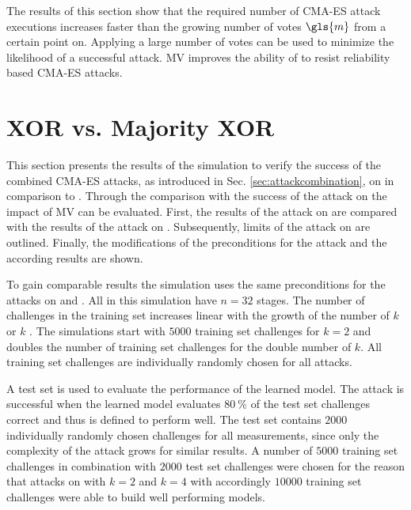 The results of this section show that the required number of \ac{CMA-ES} attack executions increases faster than the growing number of votes $\gls{m}$ from a certain point on.
Applying a large number of votes can be used to minimize the likelihood of a successful attack.
\ac{MV} improves the ability of \apufs to resist reliability based \ac{CMA-ES} attacks.


\section{\acs{XOR} \apufs vs. Majority \acs{XOR} \apufs}
\label{sec:xorarbitervsmajorityxorarbiter}


This section presents the results of the simulation to verify the success of the combined \ac{CMA-ES} attacks, as introduced in Sec. \ref{sec:attackcombination}, on \mxpufs in comparison to \xpufs.
Through the comparison with the success of the attack on \xpuf the impact of \ac{MV} can be evaluated.
First, the results of the attack on \xpufs are compared with the results of the attack on \mxpufs.
Subsequently, limits of the attack on \mxpufs are outlined.
Finally, the modifications of the preconditions for the attack and the according results are shown.

To gain comparable results the simulation uses the same preconditions for the attacks on \xpufs and \mxpufs.
All \pufs in this simulation have $n = 32$ stages.
The number of challenges in the training set increases linear with the growth of the number of $k$ \apufs or $k$ \mpufs.
The simulations start with $5000$ training set challenges for $k = 2$ and doubles the number of training set challenges for the double number of $k$.
All training set challenges are individually randomly chosen for all attacks.

A test set is used to evaluate the performance of the learned model.
The attack is successful when the learned model evaluates $80\ \%$ of the test set challenges correct and thus is defined to perform well.
The test set contains $2000$ individually randomly chosen challenges for all measurements, since only the complexity of the attack grows for similar results.
A number of $5000$ training set challenges in combination with $2000$ test set challenges were chosen for the reason that attacks on \xpufs with $k = 2$ and $k = 4$ with accordingly $10000$ training set challenges were able to build well performing models.


